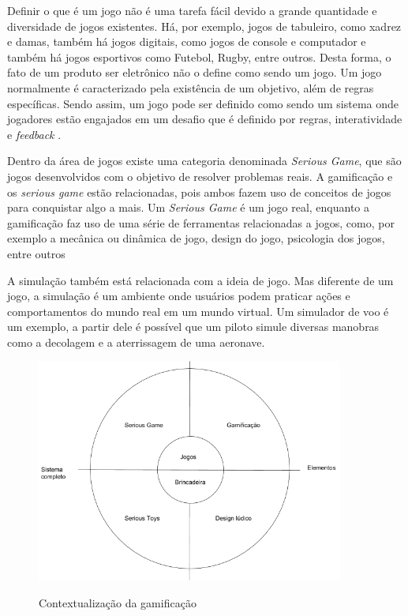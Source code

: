 \documentclass[
	12pt,				%
	oneside,			%
	a4paper,			%
	english,			%
	french,				%
	spanish,			%
	brazil,				%
	]{abntex2}
\begin{document}
Definir o que é um jogo não é uma tarefa fácil devido a grande quantidade e diversidade de jogos existentes. Há, por exemplo, jogos de tabuleiro, como xadrez e damas, também há jogos digitais, como jogos de console e computador e também há jogos esportivos como Futebol, Rugby, entre outros. Desta forma, o fato de um produto ser eletrônico não o define como sendo um jogo. Um jogo normalmente é caracterizado pela existência de um objetivo, além de regras específicas. Sendo assim, um jogo pode ser definido como sendo um sistema onde jogadores estão engajados em um desafio que é definido por regras, interatividade e \textit{feedback} \cite{kaap:2014}. 

Dentro da área de jogos existe uma categoria denominada \textit{Serious Game}, que são jogos desenvolvidos com o objetivo de resolver problemas reais. A gamificação e os \textit{serious game} estão relacionadas, pois ambos fazem uso de conceitos de jogos para conquistar algo a mais. Um \textit{Serious Game} é um jogo real, enquanto a gamificação faz uso de uma série de ferramentas relacionadas a jogos, como, por exemplo a mecânica ou dinâmica de jogo, design do jogo, psicologia dos jogos, entre outros \cite{dorling2012software}

A simulação também está relacionada com a ideia de jogo. Mas diferente de um jogo, a simulação é um ambiente onde usuários podem praticar ações e comportamentos do mundo real em um mundo virtual. Um simulador de voo é um exemplo, a partir dele é possível que um piloto simule diversas manobras como a decolagem e a aterrissagem de uma aeronave.

\begin{figure}[ht]
\centering
\caption{Contextualização da gamificação }
\includegraphics[width=0.9\textwidth]{imagens/gamificacao.png}
\label{fig:gamificacao}
\end{figure}
\end{document}
